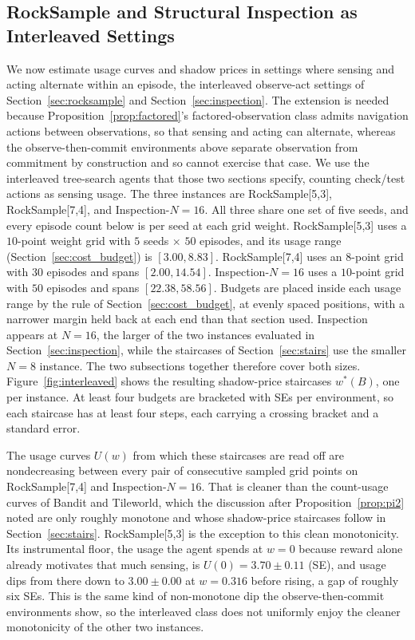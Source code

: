 \subsection{RockSample and Structural Inspection as Interleaved Settings}
\label{sec:interleaved_budget}

We now estimate usage curves and shadow prices in settings where sensing and acting alternate within an episode, the interleaved observe-act settings of Section~\ref{sec:rocksample} and Section~\ref{sec:inspection}. The extension is needed because Proposition~\ref{prop:factored}'s factored-observation class admits navigation actions between observations, so that sensing and acting can alternate, whereas the observe-then-commit environments above separate observation from commitment by construction and so cannot exercise that case. We use the interleaved tree-search agents that those two sections specify, counting check/test actions as sensing usage. The three instances are RockSample[5,3], RockSample[7,4], and Inspection-$N{=}16$. All three share one set of five seeds, and every episode count below is per seed at each grid weight. RockSample[5,3] uses a $10$-point weight grid with $5$ seeds $\times$ $50$ episodes, and its usage range (Section~\ref{sec:cost_budget}) is $[3.00, 8.83]$. RockSample[7,4] uses an $8$-point grid with $30$ episodes and spans $[2.00, 14.54]$. Inspection-$N{=}16$ uses a $10$-point grid with $50$ episodes and spans $[22.38, 58.56]$. Budgets are placed inside each usage range by the rule of Section~\ref{sec:cost_budget}, at evenly spaced positions, with a narrower margin held back at each end than that section used. Inspection appears at $N{=}16$, the larger of the two instances evaluated in Section~\ref{sec:inspection}, while the staircases of Section~\ref{sec:stairs} use the smaller $N{=}8$ instance. The two subsections together therefore cover both sizes. Figure~\ref{fig:interleaved} shows the resulting shadow-price staircases $w^*(B)$, one per instance. At least four budgets are bracketed with SEs per environment, so each staircase has at least four steps, each carrying a crossing bracket and a standard error.

The usage curves $U(w)$ from which these staircases are read off are nondecreasing between every pair of consecutive sampled grid points on RockSample[7,4] and Inspection-$N{=}16$. That is cleaner than the count-usage curves of Bandit and Tileworld, which the discussion after Proposition~\ref{prop:pi2} noted are only roughly monotone and whose shadow-price staircases follow in Section~\ref{sec:stairs}. RockSample[5,3] is the exception to this clean monotonicity. Its instrumental floor, the usage the agent spends at $w{=}0$ because reward alone already motivates that much sensing, is $U(0){=}3.70 \pm 0.11$ (SE), and usage dips from there down to $3.00 \pm 0.00$ at $w{=}0.316$ before rising, a gap of roughly six SEs. This is the same kind of non-monotone dip the observe-then-commit environments show, so the interleaved class does not uniformly enjoy the cleaner monotonicity of the other two instances.

